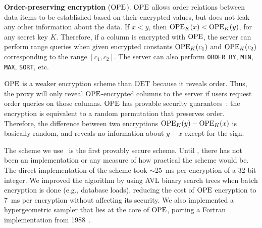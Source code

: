 \textbf{Order-preserving encryption} ($\textrm{OPE}$)\@. $\textrm{OPE}$ allows order
relations between data items to be established based on their
encrypted values, but does not leak any other information about the
data. If $x < y$, then $\textrm{OPE}_K(x) < \textrm{OPE}_K(y)$, for any secret key $K$\@.
Therefore, if a column is encrypted with $\textrm{OPE}$, the server can
perform range queries when given encrypted constants $\textrm{OPE}_K(c_1)$ and
$\textrm{OPE}_K(c_2)$ corresponding to the range $[c_1, c_2]$.  The server can
also perform {\tt ORDER BY}, {\tt MIN}, {\tt MAX}, {\tt SORT}, etc.

$\textrm{OPE}$ is a weaker encryption scheme than $\textrm{DET}$ because it reveals
order.  Thus, the \name{} proxy will only reveal $\textrm{OPE}$-encrypted
columns to the server if users request order queries on those
columns. $\textrm{OPE}$ has provable security guarantees~\cite{boldyreva-ope}: the encryption is
equivalent to a random permutation that preserves order.  Therefore,
the difference between two encryptions $\textrm{OPE}_K(y) - \textrm{OPE}_K(x)$ is
basically random, and reveals no information about $y - x$ except for
the sign.

The scheme we use~\cite{boldyreva-ope} is the first provably secure
scheme.  Until \name{}, there has not been an implementation or any
measure of how practical the scheme would be.  The direct
implementation of the scheme took $\sim$25~ms per encryption of a
32-bit integer.  We
improved the algorithm by using AVL binary search trees when batch
encryption is done (e.g., database loads), reducing the cost of $\textrm{OPE}$
encryption to 7~ms per encryption without affecting its security. We
also implemented a hypergeometric sampler that lies at the core of
$\textrm{OPE}$, porting a Fortran implementation from 1988~\cite{HGD88}.




